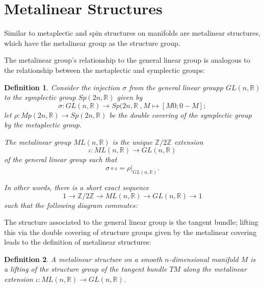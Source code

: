 \documentclass{tufte-handout}
\newtheorem{defn}{Definition} %
\begin{document}
\section{Metalinear Structures}
Similar to metaplectic and spin structures on manifolds are metalinear structures, which have the metalinear group as the structure group.

The metalinear group's relationship to the general linear group is analogous to the relationship between the metaplectic and symplectic groups:
\begin{fullwidth}
\begin{defn}
Consider the injection $\sigma$ from the general linear groupp $GL(n,\mathbb{R})$ to the symplectic group $Sp(2n,\mathbb{R})$ given by
$$ %
\sigma: GL(n,\mathbb{R}) \to Sp(2n,\mathbb{R} \;, M \mapsto [M 0 ; 0 -M];
$$
let $\rho: Mp(2n, \mathbb{R}) \to Sp(2n, \mathbb{R})$ be the double covering of the symplectic group by the metaplectic group.

The \emph{metalinear group} $ML(n,\mathbb{R})$ is the unique $\mathbb{Z}/2\mathbb{Z}$ extension
$$
\iota : ML(n,\mathbb{R}) \to GL(n,\mathbb{R})
$$
of the general linear group such that
$$
\sigma \circ \iota = \rho|_{GL(n,\mathbb{R})}.
$$

In other words, there is a short exact sequence
$$
1 \to \mathbb{Z}/2\mathbb{Z} \to ML(n,\mathbb{R}) \to GL(n,\mathbb{R}) \to 1
$$
such that the following diagram commutes:

\end{defn}
\end{fullwidth}

The structure associated to the general linear group is the tangent bundle; lifting this via the double covering of structure groups given by the metalinear covering leads to the definition of metalinear structures:
\begin{fullwidth}
\begin{defn}
A \emph{metalinear structure} on a smooth $n$-dimensional manifold $M$ is a lifting of the structure group of the tangent bundle $TM$ along the metalinear extension $\iota: ML(n,\mathbb{R}) \to GL(n,\mathbb{R})$.
\end{defn}
\end{fullwidth}
\end{document}
